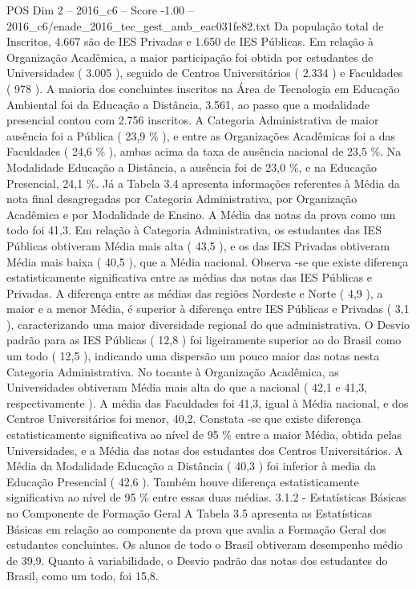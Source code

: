 \begin{textsample}{POS Dim 2 – 2016\_c6 – Score -1.00 – 2016\_c6/enade\_2016\_tec\_gest\_amb\_eac031fe82.txt}
Da população total de Inscritos, 4.667 são de IES Privadas e 1.650 de IES Públicas.
Em relação à Organização Acadêmica, a maior participação foi obtida por estudantes de Universidades ( 3.005 ), seguido de Centros Universitários ( 2.334 ) e Faculdades ( 978 ).
A maioria dos concluintes inscritos na Área de Tecnologia em Educação Ambiental foi da Educação a Distância, 3.561, ao passo que a modalidade presencial contou com 2.756 inscritos.
A Categoria Administrativa de maior ausência foi a Pública ( 23,9 \% ), e entre as Organizações Acadêmicas foi a das Faculdades ( 24,6 \% ), ambas acima da taxa de ausência nacional de 23,5 \%.
Na Modalidade Educação a Distância, a ausência foi de 23,0 \%, e na Educação Presencial, 24,1 \%.
Já a Tabela 3.4 apresenta informações referentes à Média da nota final desagregadas por Categoria Administrativa, por Organização Acadêmica e por Modalidade de Ensino.
A Média das notas da prova como um todo foi 41,3.
Em relação à Categoria Administrativa, os estudantes das IES Públicas obtiveram Média mais alta ( 43,5 ), e os das IES Privadas obtiveram Média mais baixa ( 40,5 ), que a Média nacional.
Observa -se que existe diferença estatisticamente significativa entre as médias das notas das IES Públicas e Privadas.
A diferença entre as médias das regiões Nordeste e Norte ( 4,9 ), a maior e a menor Média, é superior à diferença entre IES Públicas e Privadas ( 3,1 ), caracterizando uma maior diversidade regional do que administrativa.
O Desvio padrão para as IES Públicas ( 12,8 ) foi ligeiramente superior ao do Brasil como um todo ( 12,5 ), indicando uma dispersão um pouco maior das notas nesta Categoria Administrativa.
No tocante à Organização Acadêmica, as Universidades obtiveram Média mais alta do que a nacional ( 42,1 e 41,3, respectivamente ).
A média das Faculdades foi 41,3, igual à Média nacional, e dos Centros Universitários foi menor, 40,2.
Constata -se que existe diferença estatisticamente significativa ao nível de 95 \% entre a maior Média, obtida pelas Universidades, e a Média das notas dos estudantes dos Centros Universitários.
A Média da Modalidade Educação a Distância ( 40,3 ) foi inferior à media da Educação Presencial ( 42,6 ).
Também houve diferença estatisticamente significativa ao nível de 95 \% entre essas duas médias. 3.1.2 - Estatísticas Básicas no Componente de Formação Geral A Tabela 3.5 apresenta as Estatísticas Básicas em relação ao componente da prova que avalia a Formação Geral dos estudantes concluintes.
Os alunos de todo o Brasil obtiveram desempenho médio de 39,9.
Quanto à variabilidade, o Desvio padrão das notas dos estudantes do Brasil, como um todo, foi 15,8.

\end{textsample}
